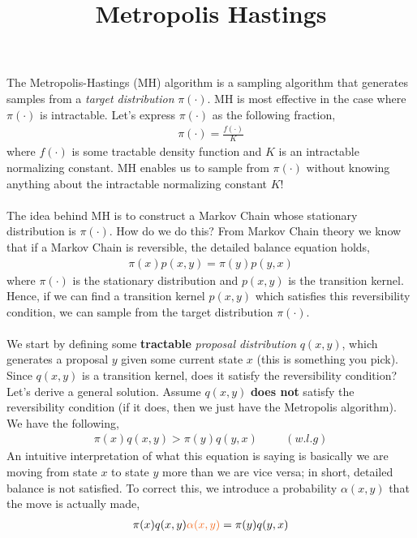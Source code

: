 \documentclass[10pt,a4paper]{article}
\title{Metropolis Hastings}
\begin{document}
\maketitle 

The Metropolis-Hastings (MH) algorithm is a sampling algorithm that generates samples from a \textit{target distribution} $\pi(\cdot)$. MH is most effective in the case where $\pi(\cdot)$ is intractable. Let's express $\pi(\cdot)$ as the following fraction,
\begin{align*}
\pi(\cdot) = \frac{f(\cdot)}{K}
\end{align*}
where $f(\cdot)$ is some tractable density function and $K$ is an intractable normalizing constant. MH enables us to sample from $\pi(\cdot)$ without knowing anything about the intractable normalizing constant $K$! 
\\
\\
The idea behind MH is to construct a Markov Chain whose stationary distribution is $\pi(\cdot)$. How do we do this? From Markov Chain theory we know that if a Markov Chain is reversible, the detailed balance equation holds,
\begin{align*}
\pi(x)p(x,y) = \pi(y)p(y,x)
\end{align*} 
where $\pi(\cdot)$ is the stationary distribution and $p(x,y)$ is the transition kernel. Hence, if we can find a transition kernel $p(x,y)$ which satisfies this reversibility condition, we can sample from the target distribution $\pi(\cdot)$.
\\
\\
We start by defining some \textbf{tractable} \textit{proposal distribution} $q(x,y)$, which generates a proposal $y$ given some current state $x$ (this is something you pick). Since $q(x,y)$ is a transition kernel, does it satisfy the reversibility condition? Let's derive a general solution. Assume $q(x,y)$ \textbf{does not} satisfy the reversibility condition (if it does, then we just have the Metropolis algorithm). We have the following,
\begin{align*}
\pi(x)q(x,y) > \pi(y)q(y,x) \hspace{1cm} (w.l.g)
\end{align*}
An intuitive interpretation of what this equation is saying is basically we are moving from state $x$ to state $y$ more than we are vice versa; in short, detailed balance is not satisfied. To correct this, we introduce a probability $\alpha(x,y)$ that the move is actually made,
\begin{align*}
\pi(x)q(x,y){\color{ocre}\alpha(x,y)} = \pi(y)q(y,x)
\end{align*}
\end{document}
